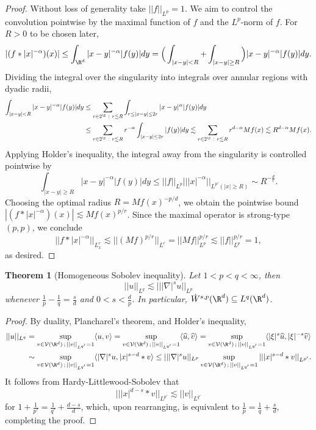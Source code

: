 \documentclass[reqno]{amsart}
\newtheorem{theorem}{Theorem}
\theoremstyle{definition}
\theoremstyle{remark}
\begin{document}
\begin{proof}
	Without loss of generality take $||f||_{L^p} = 1$. We aim to control the convolution pointwise by the maximal function of $f$ and the $L^p$-norm of $f$. For $R > 0$ to be chosen later, 	
		\[ |(f * |x|^{-\alpha})(x)| \leq \int_{\R^d} |x - y|^{-\alpha} |f(y)| dy = \Big( \int_{|x - y| < R} + \int_{|x - y| \geq R} \Big)  |x - y|^{-\alpha} |f(y)| dy. \]
	Dividing the integral over the singularity into integrals over annular regions with dyadic radii, 
		\begin{align*}
			\int_{|x - y| < R}  |x - y|^{-\alpha} |f(y)| dy 
				&\leq \sum_{r \in 2^\Z \ : \ r \lesssim R} \int_{r \leq |x - y| \leq 2r}  |x - y|^{\alpha} |f(y)| dy \\
				&\leq \sum_{r \in 2^\Z \ : \ r \lesssim R} r^{-\alpha} \int_{|x - y| \leq 2r} |f(y)| dy \lesssim  \sum_{r \in 2^\Z \ : \ r \lesssim R} r^{d- \alpha} Mf (x) \lesssim R^{d- \alpha} Mf(x).
		\end{align*}	
	Applying Holder's inequality, the integral away from the singularity is controlled pointwise by
		\[  \int_{|x - y| \geq R}  |x - y|^{-\alpha} |f(y)| dy \leq ||f||_{L^p} || |x|^{-\alpha} ||_{L^{p'} (|x| \geq R)} \sim R^{-\frac{d}{r}}. \]
	 Choosing the optimal radius $R = Mf(x)^{-p/d}$, we obtain the pointwise bound $|(f * |x|^{-\alpha} ) (x)| \lesssim Mf (x)^{p/r}$. Since the maximal operator is strong-type $(p, p)$, we conclude
		\[ ||f * |x|^{-\alpha} ||_{L^r_x} \lesssim ||(Mf)^{p/r}||_{L^r} = ||Mf||^{p/r}_{L^p} \lesssim ||f||_{L^p}^{p /r} =1,  \]
	as desired. 	
\end{proof}


\begin{theorem}[Homogeneous Sobolev inequality]
	Let $1  < p < q < \infty$, then 
		\[ ||u||_{L^q} \lesssim |||\nabla|^s u||_{L^p} \]
	whenever $\tfrac1p - \tfrac1q = \tfrac{s}{d}$ and $0 < s < \tfrac{d}{p}$. In particular, $\dot W^{s, p} (\R^d) \subseteq L^q (\R^d)$. 
\end{theorem}

\begin{proof}
	By duality, Plancharel's theorem, and Holder's inequality, 
		\begin{align*}
			 ||u||_{L^q} 
			 	&= \sup_{v \in \mathcal V (\R^d) \, ; \, ||v||_{L^{q'}} = 1} \langle u, v \rangle =  \sup_{v \in \mathcal V (\R^d) \, ; \, ||v||_{L^{q'}} = 1} \langle \widehat u, \widehat v \rangle=  \sup_{v \in \mathcal V (\R^d) \, ; \, ||v||_{L^{q'}} = 1} \langle |\xi|^s \widehat u, |\xi|^{-s} \widehat v \rangle \\
			 	&\sim  \sup_{v \in \mathcal V (\R^d) \, ; \, ||v||_{L^{q'}} = 1} \langle |\nabla|^s u, |x|^{s - d} * v \rangle \leq  || |\nabla|^s u||_{L^p} \sup_{v \in \mathcal V (\R^d) \, ; \, ||v||_{L^{q'}} = 1} |||x|^{s - d} * v||_{L^{p'}}. 
		\end{align*}	 
	It follows from Hardy-Littlewood-Sobolev that
		\[ || |x|^{d - s} * v||_{L^{p'}} \lesssim ||v||_{L^{q'}} \]
	for $1 + \tfrac{1}{p'} = \tfrac{1}{q'} + \tfrac{d - s}{d}$, which, upon rearranging, is equivalent to $\tfrac1p = \tfrac1q + \tfrac{s}{d}$, completing the proof. 
\end{proof}
\end{document}
